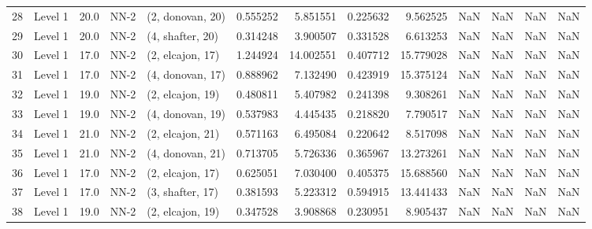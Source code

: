 \begin{tabular}{llrllrrrrrrrr}
28 &   Level 1 &   20.0 &        NN-2 &  (2, donovan, 20) &   0.555252 &   5.851551 &  0.225632 &   9.562525 &                  NaN &                    NaN &                 NaN &                   NaN \\
29 &   Level 1 &   20.0 &        NN-2 &  (4, shafter, 20) &   0.314248 &   3.900507 &  0.331528 &   6.613253 &                  NaN &                    NaN &                 NaN &                   NaN \\
30 &   Level 1 &   17.0 &        NN-2 &  (2, elcajon, 17) &   1.244924 &  14.002551 &  0.407712 &  15.779028 &                  NaN &                    NaN &                 NaN &                   NaN \\
31 &   Level 1 &   17.0 &        NN-2 &  (4, donovan, 17) &   0.888962 &   7.132490 &  0.423919 &  15.375124 &                  NaN &                    NaN &                 NaN &                   NaN \\
32 &   Level 1 &   19.0 &        NN-2 &  (2, elcajon, 19) &   0.480811 &   5.407982 &  0.241398 &   9.308261 &                  NaN &                    NaN &                 NaN &                   NaN \\
33 &   Level 1 &   19.0 &        NN-2 &  (4, donovan, 19) &   0.537983 &   4.445435 &  0.218820 &   7.790517 &                  NaN &                    NaN &                 NaN &                   NaN \\
34 &   Level 1 &   21.0 &        NN-2 &  (2, elcajon, 21) &   0.571163 &   6.495084 &  0.220642 &   8.517098 &                  NaN &                    NaN &                 NaN &                   NaN \\
35 &   Level 1 &   21.0 &        NN-2 &  (4, donovan, 21) &   0.713705 &   5.726336 &  0.365967 &  13.273261 &                  NaN &                    NaN &                 NaN &                   NaN \\
36 &   Level 1 &   17.0 &        NN-2 &  (2, elcajon, 17) &   0.625051 &   7.030400 &  0.405375 &  15.688560 &                  NaN &                    NaN &                 NaN &                   NaN \\
37 &   Level 1 &   17.0 &        NN-2 &  (3, shafter, 17) &   0.381593 &   5.223312 &  0.594915 &  13.441433 &                  NaN &                    NaN &                 NaN &                   NaN \\
38 &   Level 1 &   19.0 &        NN-2 &  (2, elcajon, 19) &   0.347528 &   3.908868 &  0.230951 &   8.905437 &                  NaN &                    NaN &                 NaN &                   NaN \\

\end{tabular}
